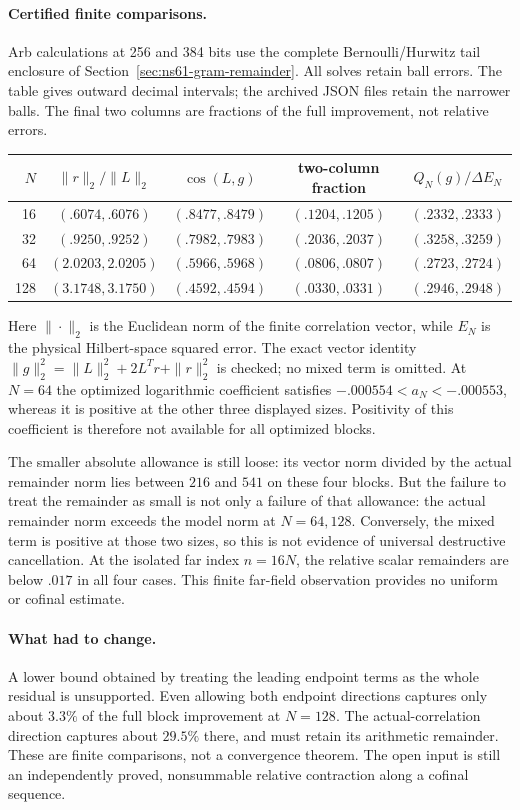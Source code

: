 \documentclass[11pt]{article}
\theoremstyle{remark}
\begin{document}
\paragraph{Certified finite comparisons.}
Arb calculations at 256 and 384 bits use the complete Bernoulli/Hurwitz
tail enclosure of Section~\ref{sec:ns61-gram-remainder}. All solves
retain ball errors. The table gives outward decimal intervals; the
archived JSON files retain the narrower balls. The final two columns
are fractions of the full improvement, not relative errors.
\begin{center}\small
\begin{tabular}{rcccc}
\toprule
$N$ & $\|r\|_2/\|L\|_2$ & $\cos(L,g)$ & two-column fraction
 & $Q_N(g)/\Delta E_N$\\
\midrule
16 & $(.6074,.6076)$ & $(.8477,.8479)$ & $(.1204,.1205)$ & $(.2332,.2333)$\\
32 & $(.9250,.9252)$ & $(.7982,.7983)$ & $(.2036,.2037)$ & $(.3258,.3259)$\\
64 & $(2.0203,2.0205)$ & $(.5966,.5968)$ & $(.0806,.0807)$ & $(.2723,.2724)$\\
128 & $(3.1748,3.1750)$ & $(.4592,.4594)$ & $(.0330,.0331)$ & $(.2946,.2948)$\\
\bottomrule
\end{tabular}\end{center}
Here $\|\cdot\|_2$ is the Euclidean norm of the finite correlation
vector, while $E_N$ is the physical Hilbert-space squared error.
The exact vector identity
$\|g\|_2^2=\|L\|_2^2+2L^Tr+\|r\|_2^2$ is checked;
no mixed term is omitted. At $N=64$ the optimized logarithmic
coefficient satisfies
$-.000554<a_N<-.000553$, whereas it is positive at the other
three displayed sizes. Positivity of this coefficient is therefore
not available for all optimized blocks.

The smaller absolute allowance is still loose: its vector norm divided
by the actual remainder norm lies between $216$ and $541$ on these
four blocks. But the failure to treat the remainder as small is not
only a failure of that allowance: the actual remainder norm exceeds
the model norm at $N=64,128$. Conversely, the mixed term is positive
at those two sizes, so this is not evidence of universal destructive
cancellation. At the isolated far index $n=16N$, the relative scalar
remainders are below $.017$ in all four cases. This finite far-field
observation provides no uniform or cofinal estimate.

\paragraph{What had to change.}
A lower bound obtained by treating the leading endpoint terms as the
whole residual is unsupported. Even allowing both endpoint directions
captures only about $3.3\%$ of the full block improvement at $N=128$.
The actual-correlation direction captures about $29.5\%$ there, and
must retain its arithmetic remainder. These are finite comparisons,
not a convergence theorem. The open input is still an independently
proved, nonsummable relative contraction along a cofinal sequence.
\end{document}
